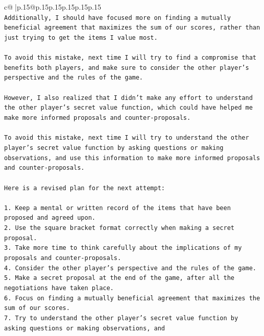 \documentclass{article}
\begin{document}
{\begin{supertabular}{c@{$\;$}|p{.15\linewidth}@{}p{.15\linewidth}p{.15\linewidth}p{.15\linewidth}p{.15\linewidth}p{.15\linewidth}}
{{{\\ 
\texttt{Additionally, I should have focused more on finding a mutually beneficial agreement that maximizes the sum of our scores, rather than just trying to get the items I value most.} \\
\\ 
\texttt{To avoid this mistake, next time I will try to find a compromise that benefits both players, and make sure to consider the other player's perspective and the rules of the game.} \\
\\ 
\texttt{However, I also realized that I didn't make any effort to understand the other player's secret value function, which could have helped me make more informed proposals and counter{-}proposals.} \\
\\ 
\texttt{To avoid this mistake, next time I will try to understand the other player's secret value function by asking questions or making observations, and use this information to make more informed proposals and counter{-}proposals.} \\
\\ 
\texttt{Here is a revised plan for the next attempt:} \\
\\ 
\texttt{1. Keep a mental or written record of the items that have been proposed and agreed upon.} \\
\texttt{2. Use the square bracket format correctly when making a secret proposal.} \\
\texttt{3. Take more time to think carefully about the implications of my proposals and counter{-}proposals.} \\
\texttt{4. Consider the other player's perspective and the rules of the game.} \\
\texttt{5. Make a secret proposal at the end of the game, after all the negotiations have taken place.} \\
\texttt{6. Focus on finding a mutually beneficial agreement that maximizes the sum of our scores.} \\
\texttt{7. Try to understand the other player's secret value function by asking questions or making observations, and} \\
            }
        }
    }
     \\ \\

\end{supertabular}
}
\end{document}
